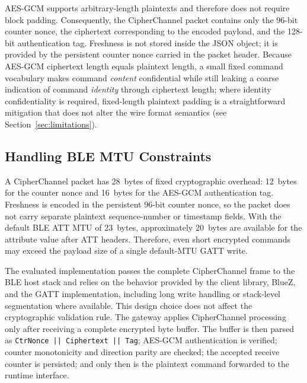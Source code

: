 \documentclass[journal]{IEEEtran}
\begin{document}
AES-GCM supports arbitrary-length plaintexts and therefore does not require block padding. Consequently, the CipherChannel packet contains only the 96-bit counter nonce, the ciphertext corresponding to the encoded payload, and the 128-bit authentication tag. Freshness is not stored inside the JSON object; it is provided by the persistent counter nonce carried in the packet header. Because AES-GCM ciphertext length equals plaintext length, a small fixed command vocabulary makes command \emph{content} confidential while still leaking a coarse indication of command \emph{identity} through ciphertext length; where identity confidentiality is required, fixed-length plaintext padding is a straightforward mitigation that does not alter the wire format semantics (see Section~\ref{sec:limitations}).


\subsection{Handling BLE MTU Constraints}
\label{sec:mtu}

A CipherChannel packet has 28~bytes of fixed cryptographic overhead: 12~bytes for the counter nonce and 16~bytes for the AES-GCM authentication tag. Freshness is encoded in the persistent 96-bit counter nonce, so the packet does not carry separate plaintext sequence-number or timestamp fields. With the default BLE ATT MTU of 23~bytes, approximately 20~bytes are available for the attribute value after ATT headers. Therefore, even short encrypted commands may exceed the payload size of a single default-MTU GATT write.

The evaluated implementation passes the complete CipherChannel frame to the BLE host stack and relies on the behavior provided by the client library, BlueZ, and the GATT implementation, including long write handling or stack-level segmentation where available. This design choice does not affect the cryptographic validation rule. The gateway applies CipherChannel processing only after receiving a complete encrypted byte buffer. The buffer is then parsed as \texttt{CtrNonce || Ciphertext || Tag}; AES-GCM authentication is verified; counter monotonicity and direction parity are checked; the accepted receive counter is persisted; and only then is the plaintext command forwarded to the runtime interface.
\end{document}
